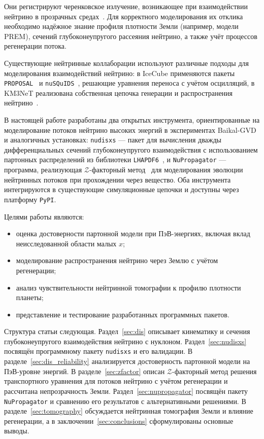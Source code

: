 Они регистрируют черенковское излучение, возникающее при взаимодействии нейтрино в прозрачных средах~\cite{Troitskii:2024}. Для корректного моделирования их отклика необходимо надёжное знание профиля плотности Земли (например, модели PREM), сечений глубоконеупругого рассеяния нейтрино, а также учёт процессов регенерации потока.

Существующие нейтринные коллаборации используют различные подходы для моделирования взаимодействий нейтрино: в IceCube применяются пакеты \texttt{PROPOSAL}~\cite{Koehne:2013gpa} и \texttt{nuSQuIDS}~\cite{ARGUELLES2022108346}, решающие уравнения переноса с учётом осцилляций, в KM3NeT реализована собственная цепочка генерации и распространения нейтрино~\cite{ARGUELLES2022108346}.  

В настоящей работе разработаны два открытых инструмента, ориентированные на моделирование потоков нейтрино высоких энергий в экспериментах Baikal-GVD и аналогичных установках:  
\texttt{nudisxs} — пакет для вычисления дважды дифференциальных сечений глубоконеупругого взаимодействия с использованием партонных распределений из библиотеки \texttt{LHAPDF6}~\cite{Buckley_2015},  
и \texttt{NuPropagator} — программа, реализующая $\mathcal{Z}$-факторный метод~\cite{Naumov:1998sf} для моделирования эволюции нейтринных потоков при прохождении через вещество.  
Оба инструмента интегрируются в существующие симуляционные цепочки и доступны через платформу \texttt{PyPI}.  

Целями работы являются:
\begin{itemize}
    \item оценка достоверности партонной модели при ПэВ-энергиях, включая вклад неисследованной области малых $x$;
    \item моделирование распространения нейтрино через Землю с учётом регенерации;
    \item анализ чувствительности нейтринной томографии к профилю плотности планеты;
    \item представление и тестирование разработанных программных пакетов.
\end{itemize}

Структура статьи следующая.  
Раздел~\ref{sec:dis} описывает кинематику и сечения глубоконеупругого взаимодействия нейтрино с нуклоном.  
Раздел~\ref{sec:nudisxs} посвящён программному пакету \texttt{nudisxs} и его валидации.  
В разделе~\ref{sec:dis_reliability} анализируется достоверность партонной модели на ПэВ-уровне энергий.  
В разделе~\ref{sec:zfactor} описан $\mathcal{Z}$-факторный метод решения транспортного уравнения для потоков нейтрино с учётом регенерации и рассчитана непрозрачность Земли.  
Раздел~\ref{sec:nupropagator} посвящён пакету \texttt{NuPropagator} и сравнению его результатов с альтернативными решениями.  
В разделе~\ref{sec:tomography} обсуждается нейтринная томография Земли и влияние регенерации, а в заключении~\ref{sec:conclusions} сформулированы основные выводы.

